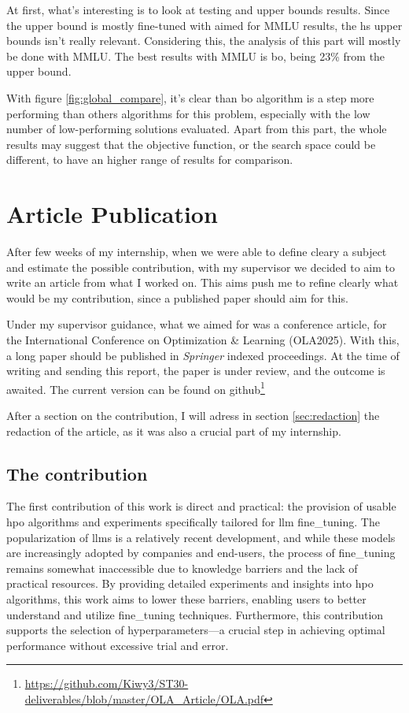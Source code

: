 At first, what's interesting is to look at testing and upper bounds results. Since the upper bound is mostly fine-tuned with aimed for MMLU results, the \Gls{hs} upper bounds isn't really relevant. Considering this, the analysis of this part will mostly be done with MMLU. The best results with MMLU is \acrfull{bo}, being 23\% from the upper bound.




With figure \ref{fig:global_compare}, it's clear than \acrshort{bo} algorithm is a step more performing than others algorithms for this problem, especially with the low number of low-performing solutions evaluated. Apart from this part, the whole results may suggest that the objective function, or the search space could be different, to have an higher range of results for comparison. 


\section{Article Publication}
\label{sec:article}

After few weeks of my internship, when we were able to define cleary a subject and estimate the possible contribution, with my supervisor we decided to aim to write an article from what I worked on. This aims push me to refine clearly what would be my contribution, since a published paper should aim for this. 

Under my supervisor guidance, what we aimed for was a conference article, for the International Conference on Optimization \& Learning (OLA2025). With this, a long paper should be published in \textit{Springer} indexed proceedings. At the time of writing and sending this report, the paper is under review, and the outcome is awaited. The current version can be found on github\footnote{\url{https://github.com/Kiwy3/ST30-deliverables/blob/master/OLA_Article/OLA.pdf}}

After a section on the contribution, I will adress in section \ref{sec:redaction} the redaction of the article, as it was also a crucial part of my internship.

\subsection{The contribution}
\label{sec:contribution}
The first contribution of this work is direct and practical: the provision of usable \acrshort{hpo} algorithms and experiments specifically tailored for \acrshort{llm} \gls{fine_tuning}. The popularization of \acrshort{llm}s is a relatively recent development, and while these models are increasingly adopted by companies and end-users, the process of \gls{fine_tuning} remains somewhat inaccessible due to knowledge barriers and the lack of practical resources. By providing detailed experiments and insights into \acrshort{hpo} algorithms, this work aims to lower these barriers, enabling users to better understand and utilize \gls{fine_tuning} techniques. Furthermore, this contribution supports the selection of \glspl{hyperparameter}—a crucial step in achieving optimal performance without excessive trial and error.

